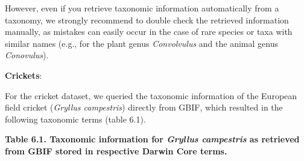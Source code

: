 \documentclass[
  oneside]{book}
\begin{document}
However, even if you retrieve taxonomic information automatically from a taxonomy, we strongly recommend to double check the retrieved information manually, as mistakes can easily occur in the case of rare species or taxa with similar names (e.g., for the plant genus \emph{Convolvulus} and the animal genus \emph{Conovulus}).

\begin{examplebox}

\textbf{Crickets}:

For the cricket dataset, we queried the taxonomic information of the European field cricket (\emph{Gryllus campestris}) directly from GBIF, which resulted in the following taxonomic terms (table 6.1).

{\textbf{Table 6.1. Taxonomic information for \emph{Gryllus campestris} as retrieved from GBIF stored in respective Darwin Core terms.}}


\end{examplebox}
\end{document}
